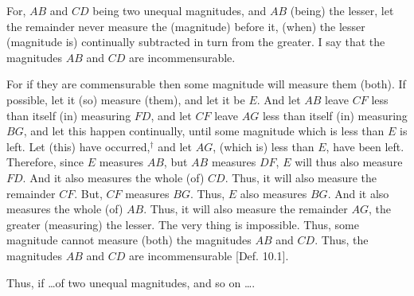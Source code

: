 \begin{Parallel}{}{}
{For, $AB$ and $CD$ being two unequal magnitudes, and $AB$ (being) the lesser, let the remainder
never measure the (magnitude) before it,
(when) the lesser (magnitude is) continually subtracted in turn from the greater. I say that
the magnitudes $AB$ and $CD$ are incommensurable.

\epsfysize=0.9in
\centerline{}

For if they are commensurable then some magnitude will measure them (both). If possible, let it
(so) measure (them),  and let it be $E$. And let $AB$ leave $CF$
less than itself (in) measuring $FD$, and let $CF$ leave $AG$ less than
itself (in) measuring $BG$, and let this happen continually, until  some magnitude which is less than  $E$ is left. Let (this) have occurred,$^\dag$ and
let $AG$, (which is) less than $E$, have been left. Therefore, since
$E$ measures $AB$, but $AB$ measures $DF$, $E$ will thus also measure $FD$. And it also measures the whole (of) $CD$. Thus, it will
also measure the remainder  $CF$. But, $CF$ measures $BG$. Thus,
$E$ also measures $BG$. And it also measures the whole (of) $AB$. 
Thus, it will also measure the remainder $AG$, the greater (measuring)
the lesser. The very thing is impossible. Thus, some magnitude cannot
measure (both) the magnitudes $AB$ and $CD$. Thus, the
magnitudes $AB$ and $CD$ are incommensurable [Def. 10.1].

Thus, if \ldots of two unequal magnitudes, and so on \ldots.}
\end{Parallel}


\vspace{7pt}{\footnotesize\noindent$^\dag$ The fact that this will eventually occur is guaranteed by
Prop.~10.1.}

